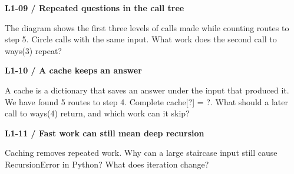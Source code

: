 \documentclass[11pt,a4paper]{article}
\begin{document}
\par\noindent\begin{minipage}{\linewidth}
\textbf{L1-09 / Repeated questions in the call tree}\par\smallskip The diagram shows the first three levels of calls made while counting routes to step 5. Circle calls with the same input. What work does the second call to ways(3) repeat?\par
\begin{center}\end{center}
\end{minipage}\par\vspace{2mm}
\par\noindent\begin{minipage}{\linewidth}
\textbf{L1-10 / A cache keeps an answer}\par\smallskip A cache is a dictionary that saves an answer under the input that produced it. We have found 5 routes to step 4. Complete cache[?] = ?. What should a later call to ways(4) return, and which work can it skip?\par
\end{minipage}\par\vspace{2mm}
\par\noindent\begin{minipage}{\linewidth}
\textbf{L1-11 / Fast work can still mean deep recursion}\par\smallskip Caching removes repeated work. Why can a large staircase input still cause RecursionError in Python? What does iteration change?\par
\end{minipage}\par\vspace{2mm}
\end{document}
